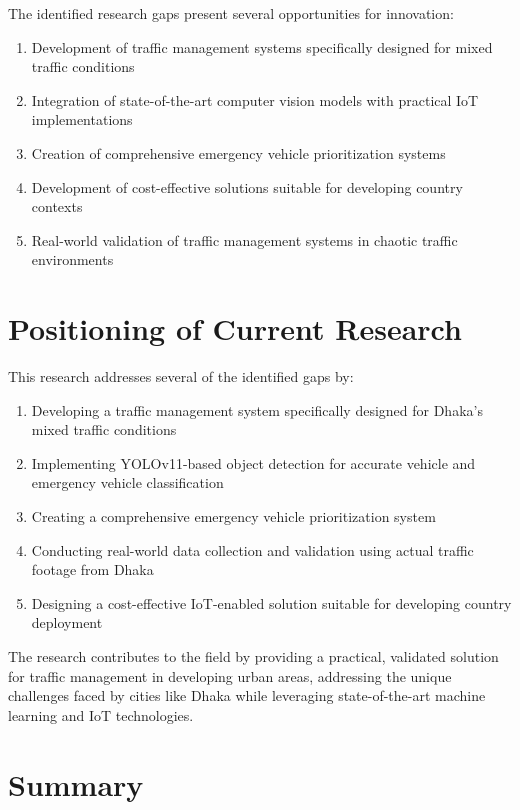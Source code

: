 The identified research gaps present several opportunities for innovation:

\begin{enumerate}
    \item Development of traffic management systems specifically designed for mixed traffic conditions
    \item Integration of state-of-the-art computer vision models with practical IoT implementations
    \item Creation of comprehensive emergency vehicle prioritization systems
    \item Development of cost-effective solutions suitable for developing country contexts
    \item Real-world validation of traffic management systems in chaotic traffic environments
\end{enumerate}

\section{Positioning of Current Research}

This research addresses several of the identified gaps by:

\begin{enumerate}
    \item Developing a traffic management system specifically designed for Dhaka's mixed traffic conditions
    \item Implementing YOLOv11-based object detection for accurate vehicle and emergency vehicle classification
    \item Creating a comprehensive emergency vehicle prioritization system
    \item Conducting real-world data collection and validation using actual traffic footage from Dhaka
    \item Designing a cost-effective IoT-enabled solution suitable for developing country deployment
\end{enumerate}

The research contributes to the field by providing a practical, validated solution for traffic management in developing urban areas, addressing the unique challenges faced by cities like Dhaka while leveraging state-of-the-art machine learning and IoT technologies.

\section{Summary}

